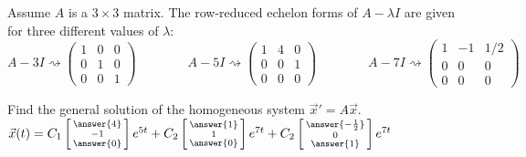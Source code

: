 \documentclass{ximera}
\begin{document}
\begin{exercise}
    Assume $A$ is a $3\times 3$ matrix. The row-reduced echelon forms of $A-\lambda I$ are given for three different values of $\lambda$: $$A-3I \rightsquigarrow \begin{pmatrix} 1&0&0\\ 0&1&0\\ 0&0&1 \end{pmatrix} \qquad\qquad  A-5I \rightsquigarrow \begin{pmatrix} 1&4&0\\ 0&0&1\\ 0&0&0 \end{pmatrix}\qquad\qquad A-7I \rightsquigarrow \begin{pmatrix} 1&-1&1/2\\ 0&0&0\\ 0&0&0 \end{pmatrix}$$
    
    Find the general solution of the homogeneous system $\vec{x}'=A\vec{x}$.\\
    $\vec{x}(t) = C_1\left[\begin{smallmatrix} \answer{4} \\ -1 \\ \answer{0} \end{smallmatrix}\right]e^{5t} + C_2\left[\begin{smallmatrix} \answer{1} \\ 1 \\ \answer{0} \end{smallmatrix}\right]e^{7t} + C_2\left[\begin{smallmatrix} \answer{-\frac{1}{2}} \\ 0 \\ \answer{1} \end{smallmatrix}\right]e^{7t}$
\end{exercise}
\end{document}
